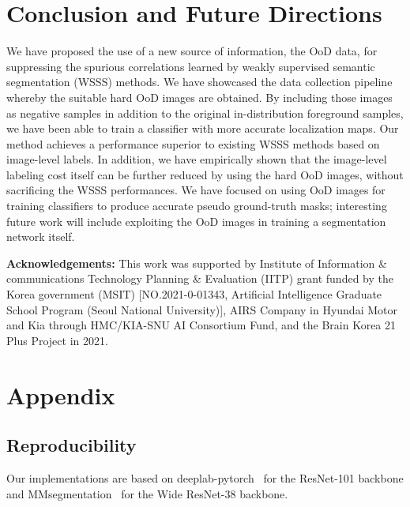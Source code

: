 \documentclass[10pt,twocolumn,letterpaper]{article}
\begin{document}
\section{Conclusion and Future Directions}
\vspace{-0.3em}
We have proposed the use of a new source of information, the OoD data, for suppressing the spurious correlations learned by weakly supervised semantic segmentation (WSSS) methods. 
We have showcased the data collection pipeline whereby the suitable hard OoD images are obtained.
By including those images as negative samples in addition to the original in-distribution foreground samples, we have been able to train a classifier with more accurate localization maps. 
Our method achieves a performance superior to existing WSSS methods based on image-level labels.
In addition, we have empirically shown that the image-level labeling cost itself can be further reduced by using the hard OoD images, without sacrificing the WSSS performances. 
We have focused on using OoD images for training classifiers to produce accurate pseudo ground-truth masks; interesting future work will include exploiting the OoD images in training a segmentation network itself.





\bigskip
\vspace{-0.5em}
\noindent\textbf{Acknowledgements:}
This work was supported by Institute of Information \& communications Technology Planning \& Evaluation (IITP) grant funded by the Korea government (MSIT) [NO.2021-0-01343, Artificial Intelligence Graduate School Program (Seoul National University)], 
AIRS Company in Hyundai Motor and Kia through HMC/KIA-SNU AI Consortium Fund, and the Brain Korea 21 Plus Project in 2021.


{\small


}
\setcounter{section}{0}
\renewcommand\thesection{\Alph{section}}
\setcounter{table}{0}
\renewcommand{\thetable}{A\arabic{table}}
\setcounter{figure}{0}
\renewcommand{\thefigure}{A\arabic{figure}}
\clearpage
\section{Appendix}
\subsection{Reproducibility}
Our implementations are based on deeplab-pytorch~\cite{pytorchdeeplab} for the ResNet-101 backbone and MMsegmentation~\cite{mmseg2020} for the Wide ResNet-38 backbone.
\end{document}
